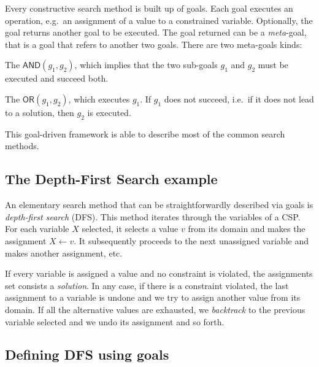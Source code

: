 \documentclass{ws-ijait}
\begin{document}
Every constructive search method is built up of goals. Each
goal executes an operation, e.g.\ an assignment of a value
to a constrained variable. Optionally, the goal returns
another goal to be executed. The goal returned can be a
\emph{meta}-goal, that is a goal that refers to another two
goals. There are two meta-goals kinds:
\begin{romanlist}
  \item The $\mathsf{AND}(g_1,g_2)$, which implies that the
        two sub-goals $g_1$ and $g_2$ must be executed and
        succeed both.
  \item The $\mathsf{OR}(g_1,g_2)$, which executes $g_1$. If
        $g_1$ does not succeed, i.e.\ if it does not lead to
        a solution, then $g_2$ is executed.
\end{romanlist}
This goal-driven framework is able to describe most of the
common search methods.

\subsection{The Depth-First Search example}

An elementary search method that can be straightforwardly
described via goals is \emph{depth-first search} (DFS). This
method iterates through the variables of a CSP\@. For each
variable $X$ selected, it selects a value $v$ from its
domain and makes the assignment $X \gets v$. It subsequently
proceeds to the next unassigned variable and makes another
assignment, etc.

If every variable is assigned a value and no constraint is
violated, the assignments set consists a \emph{solution}. In
any case, if there is a constraint violated, the last
assignment to a variable is undone and we try to assign
another value from its domain. If all the alternative values
are exhausted, we \emph{backtrack} to the previous variable
selected and we undo its assignment and so forth.

\subsection{Defining DFS using goals}
\end{document}
